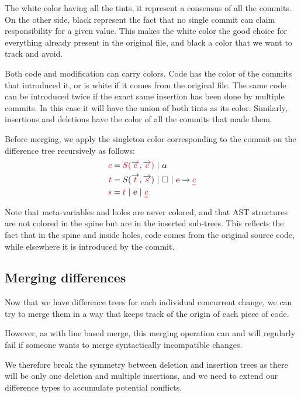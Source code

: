 \documentclass[a4paper,10pt]{article}
\newcommand{\typsep}{\ |\ }
\begin{document}
The white color having all the tints, it represent a consensus of all the commits. On the other side, black represent the fact that no single commit can claim responsibility for a given value. This makes the white color the good choice for everything already present in the original file, and black a color that we want to track and avoid.

Both code and modification can carry colors. Code has the color of the commits that introduced it, or is white if it comes from the original file. The same code can be introduced twice if the exact same insertion has been done by multiple commits. In this case it will have the union of both tints as its color. Similarly, insertions and deletions have the color of all the commits that made them.

Before merging, we apply the singleton color corresponding to the commit on the difference tree recursively as follows:
\begin{align*}
{\color{red}c} &= {\color{red}S(\overrightarrow{c}, \overrightarrow{c})} \typsep \alpha\\
{\color{red}t} &= S(\overrightarrow{\color{red}t}, \overrightarrow{\color{red}s}) \typsep \square \typsep \text{\setstcolor{red}\st{$c$}} \rightarrow \text{\color{red}\ul{$c$}}\\
{\color{red}s} &= {\color{red}t} \typsep \text{\setstcolor{red}\st{$c$}} \typsep \text{\color{red}\ul{$c$}}\\
\end{align*}

Note that meta-variables and holes are never colored, and that AST structures are not colored in the spine but are in the inserted sub-trees. This reflects the fact that in the spine and inside holes, code comes from the original source code, while elsewhere it is introduced by the commit.

\subsection{Merging differences}
Now that we have difference trees for each individual concurrent change, we can try to merge them in a way that keeps track of the origin of each piece of code.

However, as with line based merge, this merging operation can and will regularly fail if someone wants to merge syntactically incompatible changes.

We therefore break the symmetry between deletion and insertion trees as there will be only one deletion and multiple insertions, and we need to extend our difference types to accumulate potential conflicts.
\end{document}

